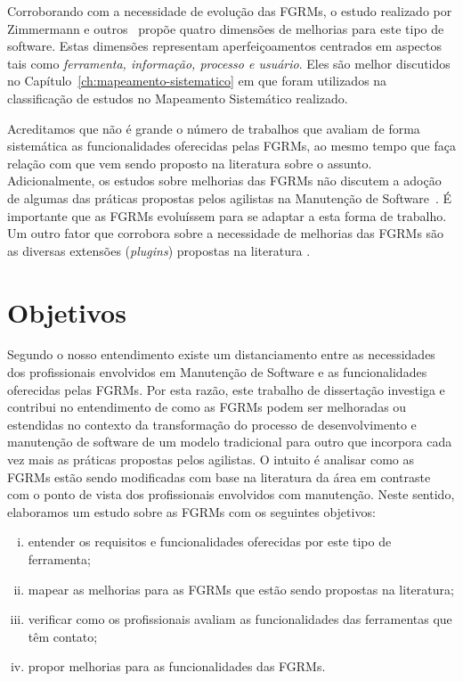 Corroborando com a necessidade de evolução das FGRMs, o estudo realizado por
Zimmermann e outros~\cite{zimmermann2009improving} propõe quatro dimensões de
melhorias para este tipo de software. Estas dimensões representam
aperfeiçoamentos centrados em aspectos tais como \textit{ferramenta, informação,
    processo e usuário}. Eles são melhor discutidos no
Capítulo~\ref{ch:mapeamento-sistematico} em que foram utilizados na
classificação de estudos no Mapeamento Sistemático realizado.

Acreditamos que não é grande o número de trabalhos que avaliam de forma
sistemática as funcionalidades oferecidas pelas FGRMs, ao mesmo tempo que faça
relação com que vem sendo proposto na li\-te\-ra\-tu\-ra sobre o assunto.
Adicionalmente, os estudos sobre melhorias das FGRMs não discutem a adoção de
algumas das práticas propostas pelos agilistas na Manutenção de
Software~\cite{Soltan2016, Heeager2015}. É importante que as FGRMs evoluíssem
para se adaptar a esta forma de trabalho. Um outro fator que corrobora sobre a
necessidade de melhorias das FGRMs são as diversas extensões (\textit{plugins})
propostas na literatura
\cite{101186,Thung:2014:BIT:2635868.2661678,Kononenko:2014:DED:2591062.2591075}.

\section{Objetivos}
\label{sec:intro-objetivos}

Segundo o nosso entendimento existe um distanciamento entre as necessidades dos
profissionais envolvidos em Manutenção de Software e as funcionalidades
oferecidas pelas FGRMs\@. Por esta razão, este trabalho de dissertação investiga
e contribui no entendimento de como as FGRMs podem ser melhoradas ou estendidas
no contexto da transformação do processo de desenvolvimento e manutenção de
software de um modelo tradicional para outro que incorpora cada vez mais as
práticas propostas pelos agilistas. O intuito é analisar como as FGRMs estão
sendo modificadas com base na literatura da área em contraste com o ponto de
vista dos profissionais envolvidos com manutenção. Neste sentido, elaboramos um
estudo sobre as FGRMs com os seguintes objetivos:

\begin{enumerate}[(i)]
	\item entender os requisitos e funcionalidades oferecidas por este tipo de
        ferramenta;
	\item mapear as melhorias para as FGRMs que estão sendo propostas na
		literatura;
    \item verificar como os profissionais avaliam as funcionalidades das
        ferramentas que têm contato;
	\item propor melhorias para as funcionalidades das FGRMs\@.
\end{enumerate}

